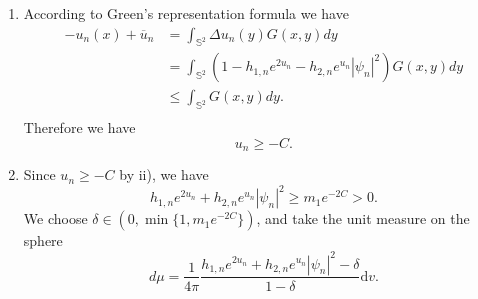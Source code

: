 \documentclass[a4paper, 12pt]{article}
\begin{document}
\begin{enumerate}[label=\roman*), leftmargin=*]
\begin{equation}
	\end{equation}
	where $\frac{1}{p}+\frac{1}{q}=1, p>1$. Take  $p=\frac {16}{9}$, then  $q=\frac {16}{7}$. It follows from (\ref{S-L-Holder}) that
	$$\begin{aligned}
		2\int_{{\mathbb{S}^2}} {{{\left| {\nabla u_n} \right|}^2}{\text{d}{v}}}  +2\int_{{\mathbb{S}^2}} u_n{\text{d}{v}} &\leq 4\pi\log \left( {M_1{e^{\frac{1}{2\pi}\int_{{\mathbb{S}^2}} {{{\left| {\nabla u_n} \right|}^2}{\text{d}{v}}}  + 4\bar u_n}} + \frac{{{M_2}}}{{{{\left( {4\pi } \right)}^{1/q}}}}{{\left\| \psi_n  \right\|}_{L^{\frac{32}{7}}}^2}\left( {{e^{\frac{1}{2\pi}\int_{{\mathbb{S}^2}} {{{\left| {\nabla u_n} \right|}^2}{\text{d}{v}}}  +  {3} \bar u_n}}} \right)} \right)\\
		&\leq 2\int_{{\mathbb{S}^2}} {{{\left| {\nabla u_n} \right|}^2}{\text{d}{v}} + 4\pi \log \left( {M_1{e^{4\bar u_n}} + C{e^{3\bar u_n}}} \right)}.
	\end{aligned}
	$$
	Hence we obtain
	\[
	{e^{2\bar u_n}} \leq M_1{e^{4\bar u_n}} + C{e^{3\bar u_n}},
	\]
	which means $\bar u_n$ has a lower bound, i.e.
	\begin{equation}\label{mean-low}
		\bar u_n \geq  - C.
	\end{equation}			
	Putting (\ref{energy-bound}) and (\ref{mean-low}) together, we obtain
	\begin{equation}\label{mean-bound}
		\left| {{{\bar u}_n}} \right| \leq C.
	\end{equation}
	\item According to Green's representation formula we have \[\begin{aligned}
		- u_n\left( x \right) + \overline u_n & = \int_{{\mathbb{S}^2}} {\Delta u_n(y)G(x,y)dy}   \\
		&= \int_{{\mathbb{S}^2}} {\left( {1 - {h_{1,n}}{e^{2u_n}} - {h_{2,n}}{e^{u_n}}\left| \psi_n  \right|^2} \right)G(x,y)dy}   \\
		&\leq \int_{{\mathbb{S}^2}} {G(x,y)dy}.   \\
	\end{aligned} \]
	Therefore we have \[{u_n} \geq  - C.\]
	\item Since ${u_n} \geq  - C$ by ii), we have
	$$
	{h_{1,n}}{e^{2u_n}} +{h_{2,n}} {e^{u_n}}{{\left| \psi_n  \right|}^2}\geq m_1e^{-2C}>0.
	$$
	We choose $\delta \in (0, \min\{1, m_1e^{-2C}\})$, and take the unit measure on the sphere
	\[
	d\mu=\frac{1}{4\pi} {\frac { {{h_{1,n}}{e^{2{u_n}}} +{h_{2,n}} {e^{u_n}}{{\left| \psi_n  \right|}^2}}-\delta }{1-\delta}{\text{d}{v}}}.\]
	

\end{enumerate}
\end{document}
